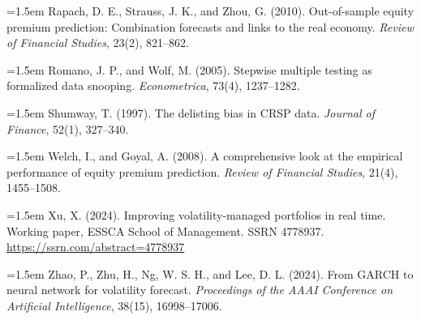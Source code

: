 \hangindent=1.5em Rapach, D. E., Strauss, J. K., and Zhou, G. (2010). Out-of-sample equity premium prediction: Combination forecasts and links to the real economy. \textit{Review of Financial Studies}, 23(2), 821--862.\par\smallskip
\hangindent=1.5em Romano, J. P., and Wolf, M. (2005). Stepwise multiple testing as formalized data snooping. \textit{Econometrica}, 73(4), 1237--1282.\par\smallskip
\hangindent=1.5em Shumway, T. (1997). The delisting bias in CRSP data. \textit{Journal of Finance}, 52(1), 327--340.\par\smallskip
\hangindent=1.5em Welch, I., and Goyal, A. (2008). A comprehensive look at the empirical performance of equity premium prediction. \textit{Review of Financial Studies}, 21(4), 1455--1508.\par\smallskip
\hangindent=1.5em Xu, X. (2024). Improving volatility-managed portfolios in real time. Working paper, ESSCA School of Management. SSRN 4778937. \url{https://ssrn.com/abstract=4778937}\par\smallskip
\hangindent=1.5em Zhao, P., Zhu, H., Ng, W. S. H., and Lee, D. L. (2024). From GARCH to neural network for volatility forecast. \textit{Proceedings of the AAAI Conference on Artificial Intelligence}, 38(15), 16998--17006.\par\smallskip
\endgroup
